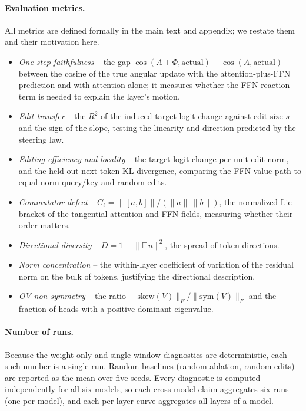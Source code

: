 \documentclass[11pt]{article}
\begin{document}
\paragraph{Evaluation metrics.}
All metrics are defined formally in the main text and appendix; we restate them and
their motivation here.
\begin{itemize}\setlength\itemsep{1pt}
\item \emph{One-step faithfulness} -- the gap
$\cos(A{+}\Phi,\text{actual})-\cos(A,\text{actual})$ between the cosine of the true
angular update with the attention-plus-FFN prediction and with attention alone;
it measures whether the FFN reaction term is needed to explain the layer's motion.
\item \emph{Edit transfer} -- the $R^2$ of the induced target-logit change against edit
size $s$ and the sign of the slope, testing the linearity and direction predicted by
the steering law.
\item \emph{Editing efficiency and locality} -- the target-logit change per unit edit
norm, and the held-out next-token KL divergence, comparing the FFN value path to
equal-norm query/key and random edits.
\item \emph{Commutator defect} -- $C_\ell=\lVert[a,b]\rVert/(\lVert a\rVert\,\lVert b\rVert)$,
the normalized Lie bracket of the tangential attention and FFN fields, measuring
whether their order matters.
\item \emph{Directional diversity} -- $D=1-\lVert\mathbb{E}\,u\rVert^2$, the spread of
token directions.
\item \emph{Norm concentration} -- the within-layer coefficient of variation of the
residual norm on the bulk of tokens, justifying the directional description.
\item \emph{OV non-symmetry} -- the ratio
$\lVert\mathrm{skew}(V)\rVert_F/\lVert\mathrm{sym}(V)\rVert_F$ and the fraction of
heads with a positive dominant eigenvalue.
\end{itemize}

\paragraph{Number of runs.}
Because the weight-only and single-window diagnostics are deterministic, each such
number is a single run. Random baselines (random ablation, random edits) are reported
as the mean over five seeds. Every diagnostic is computed independently for all six
models, so each cross-model claim aggregates six runs (one per model), and each
per-layer curve aggregates all layers of a model.
\end{document}
